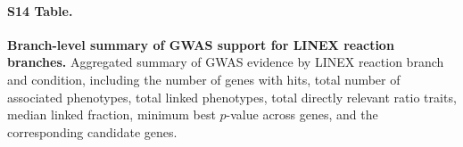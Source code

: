 \documentclass[9pt,twocolumn,twoside]{rilabRxiv}
\begin{document}
\paragraph*{S14 Table.}
\makeatletter
\def\@currentlabelname{S14 Table}
\makeatother
\label{S14_Table}
\textbf{Branch-level summary of GWAS support for LINEX reaction branches.} Aggregated summary of GWAS evidence by LINEX reaction branch and condition, including the number of genes with hits, total number of associated phenotypes, total linked phenotypes, total directly relevant ratio traits, median linked fraction, minimum best $p$-value across genes, and the corresponding candidate genes.
\end{document}
